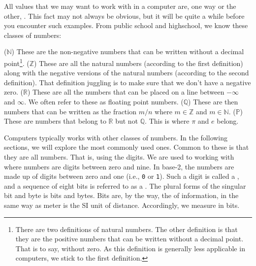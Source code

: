 All values that we may want to work with in a computer are, one way or the other, . This fact may not always be obvious, but it will be quite a while before you encounter such examples. From public school and highschool, we know these classes of numbers:
\begin{itemize}
   ($\mathbb{N}$) These are the non-negative numbers that can be written without a decimal point\footnote{There are two definitions of natural numbers. The other definition is that they are the positive numbers that can be written without a decimal point. That is to say, without zero. As this definition is generally less applicable in computers, we stick to the first definition.}.
   ($\mathbb{Z}$) These are all the natural numbers (according to the first definition) along with the negative versions of the natural numbers (according to the second definition). That definition juggling is to make sure that we don't have a negative zero.
   ($\mathbb{R}$) These are all the numbers that can be placed on a line between $-\infty$ and $\infty$. We often refer to these as floating point numbers.
   ($\mathbb{Q}$) These are then numbers that can be written as the fraction $m/n$ where $m \in \mathbb{Z}$ and $m \in \mathbb{N}$.
   ($\mathbb{P}$) These are numbers that belong to $\mathbb{R}$ but not $\mathbb{Q}$. This is where $\pi$ and $e$ belong.
\end{itemize}
Computers typically works with other classes of numbers. In the following sections, we will explore the most commonly used ones. Common to these is that they are all  numbers. That is, using the  digits. We are used to working with  where numbers are digits between zero and nine. In base-2, the numbers are made up of digits between zero and one (i.e., \texttt{0} or \texttt{1}). Such a digit is called a , and a sequence of eight bits is referred to as a . The plural forms of the singular bit and byte is bits and bytes. Bits are, by the way, the  of information, in the same way as meter is the SI unit of distance. Accordingly, we measure  in bits.

